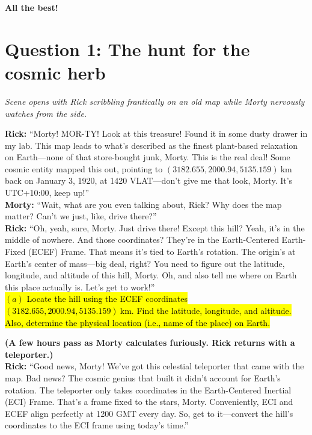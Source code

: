 \documentclass[a4paper, 12pt]{exam}
\begin{document}
	\begin{center}
		\textbf{All the best!}
	\end{center}
		
	\pagebreak
	


\section*{Question 1: The hunt for the cosmic herb}

\noindent \textit{Scene opens with Rick scribbling frantically on an old map while Morty nervously watches from the side.}

\bigskip
\noindent \textbf{Rick:} “Morty! MOR-TY! Look at this treasure! Found it in some dusty drawer in my lab. This map leads to what’s described as the finest plant-based relaxation on Earth—none of that store-bought junk, Morty. This is the real deal! Some cosmic entity mapped this out, pointing to $(3182.655, 2000.94, 5135.159) \ \mathrm{km}$ back on January 3, 1920, at 1420 VLAT—don’t give me that look, Morty. It’s UTC+10:00, keep up!” \\

\noindent \textbf{Morty:} “Wait, what are you even talking about, Rick? Why does the map matter? Can’t we just, like, drive there?” \\

\noindent \textbf{Rick:} “Oh, yeah, sure, Morty. Just drive there! Except this hill? Yeah, it’s in the middle of nowhere. And those coordinates? They’re in the Earth-Centered Earth-Fixed (ECEF) Frame. That means it’s tied to Earth’s rotation. The origin’s at Earth’s center of mass—big deal, right? You need to figure out the latitude, longitude, and altitude of this hill, Morty. Oh, and also tell me where on Earth this place actually is. Let’s get to work!” \\

\hl{$(a)$ Locate the hill using the ECEF coordinates $(3182.655, 2000.94, 5135.159) \ \mathrm{km}$. Find the latitude, longitude, and altitude. Also, determine the physical location (i.e., name of the place) on Earth.}

\bigskip
\noindent \textbf{(A few hours pass as Morty calculates furiously. Rick returns with a teleporter.)} \\

\noindent \textbf{Rick:} “Good news, Morty! We’ve got this celestial teleporter that came with the map. Bad news? The cosmic genius that built it didn’t account for Earth’s rotation. The teleporter only takes coordinates in the Earth-Centered Inertial (ECI) Frame. That’s a frame fixed to the stars, Morty. Conveniently, ECI and ECEF align perfectly at 1200 GMT every day. So, get to it—convert the hill’s coordinates to the ECI frame using today’s time.” \\
\end{document}
